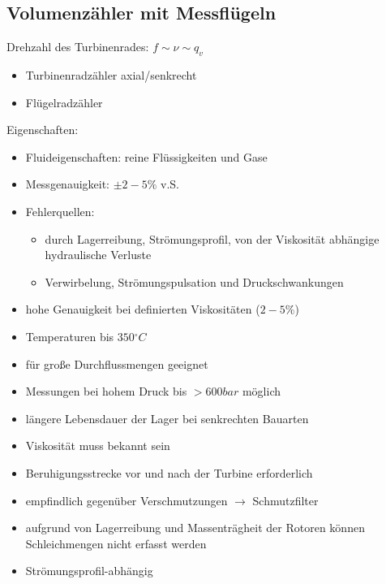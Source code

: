 \subsection{Volumenzähler mit Messflügeln}
Drehzahl des Turbinenrades: $f \sim \nu \sim q_v$
\begin{itemize}
\item Turbinenradzähler axial/senkrecht
\item Flügelradzähler
\end{itemize}
Eigenschaften:
\begin{itemize}
\item Fluideigenschaften: reine Flüssigkeiten und Gase
\item Messgenauigkeit: $\pm 2-5\%$ v.S.
\item Fehlerquellen:
\begin{itemize}
\item durch Lagerreibung, Strömungsprofil, von der Viskosität abhängige hydraulische Verluste
\item Verwirbelung, Strömungspulsation und Druckschwankungen
\end{itemize}
\end{itemize}
\begin{itemize}[label=$+$]
\item hohe Genauigkeit bei definierten Viskositäten ($2-5\%$)
\item Temperaturen bis $350\unit{^\circ C}$
\item für große Durchflussmengen geeignet
\item Messungen bei hohem Druck bis $>600 \unit{bar}$ möglich
\item längere Lebensdauer der Lager bei senkrechten Bauarten
\end{itemize}
\begin{itemize}[label=$-$]
\item Viskosität muss bekannt sein
\item Beruhigungsstrecke vor und nach der Turbine erforderlich
\item empfindlich gegenüber Verschmutzungen $\to$ Schmutzfilter
\item aufgrund von Lagerreibung und Massenträgheit der Rotoren können Schleichmengen nicht erfasst werden
\item Strömungsprofil-abhängig
\end{itemize}
